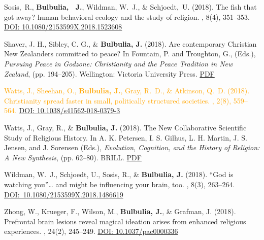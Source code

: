 \documentclass{article}
\begin{document}
\begin{thebibliography}{99}
Sosis,~R., {\bf Bulbulia, ~J.}, Wildman, W.~J., \& Schjoedt,~U. (2018).
\newblock The fish that got away? human behavioral ecology and the study of religion. 
, 8(4), 351--353. 
\href{https://doi.org/10.1080/2153599X.2018.1523608}{DOI: 10.1080/2153599X.2018.1523608}


Shaver, J. H., Sibley, C. G., \& {\bf Bulbulia, J.} (2018).
\newblock Are contemporary {C}hristian {N}ew {Z}ealanders committed to peace?
\newblock In Fountain, P. and Troughton, G., (Eds.), {\em Pursuing Peace in
  Godzone: Christianity and the Peace Tradition in New Zealand}, (pp. 194--205). Wellington: Victoria University Press.
\href{https://www.dropbox.com/s/2gklu6owh2yypgs/PPIGShaverBulbulia.pdf?dl=0}{PDF}


\textcolor{Orange}{Watts, J., Sheehan, O., {\bf Bulbulia, J.}, Gray, R.~D., \& Atkinson, Q.~D. (2018).
\newblock Christianity spread faster in small, politically structured societies.
, 2(8), 559--564.}
\href{https://doi.org/10.1038/s41562-018-0379-3}{DOI: 10.1038/s41562-018-0379-3}


Watts, J., Gray, R., \& {\bf Bulbulia, J.} (2018). 
\newblock The New Collaborative Scientific Study of Religious History. 
\newblock In A. K. Petersen, I. S. Gilhus, L. H. Martin, J. S. Jensen, and J. Sorensen (Eds.), {\em Evolution, Cognition, and the History of Religion: A New Synthesis}, (pp. 62--80). BRILL. 
\href{https://www.dropbox.com/s/wr5nq9ygiybspfp/WattsGrayAndBulbulia.pdf?dl=0}{PDF}


Wildman, W.~J., Schjoedt, U., Sosis, R., \& {\bf Bulbulia, J.} (2018).
\newblock ``God is watching you''{\ldots} and might be influencing your brain, too. 
, 8(3), 263--264.
\href{https://doi.org/10.1080/2153599X.2018.1486619}{DOI:~10.1080/2153599X.2018.1486619}


Zhong, W., Krueger, F., Wilson, M., {\bf Bulbulia, J.}, \& Grafman, J. (2018). 
\newblock Prefrontal brain lesions reveal magical ideation arises from enhanced religious experiences. 
, 24(2), 245--249. 
\href{http://dx.doi.org/10.1037/pac0000336}{DOI: 10.1037/pac0000336}




\end{thebibliography}
\end{document}
